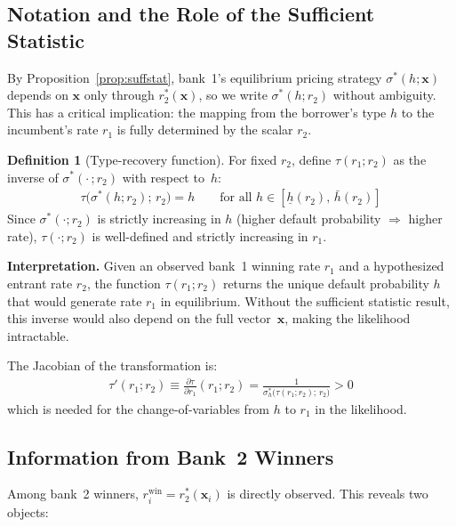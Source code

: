\documentclass[12pt]{article}
\theoremstyle{plain}
\theoremstyle{plain}
\theoremstyle{definition}  %
\newtheorem{definition}[thm]{Definition}  %
\theoremstyle{remark}  %
\begin{document}
\subsection{Notation and the Role of the Sufficient Statistic}\label{sec:prelim}

By Proposition~\ref{prop:suffstat}, bank~1's equilibrium pricing strategy $\sigma^*(h;\mathbf{x})$ depends on $\mathbf{x}$ only through $r_2^*(\mathbf{x})$, so we write $\sigma^*(h; r_2)$ without ambiguity. This has a critical implication: the mapping from the borrower's type $h$ to the incumbent's rate $r_1$ is fully determined by the scalar $r_2$.

\begin{definition}[Type-recovery function]\label{def:tau}
For fixed $r_2$, define $\tau(r_1; r_2)$ as the inverse of $\sigma^*(\cdot\,; r_2)$ with respect to~$h$:
\begin{align}\label{eq:tau_def}
    \tau\!\big(\sigma^*(h; r_2);\, r_2\big) = h \qquad \text{for all } h \in [\underline{h}(r_2),\, \bar{h}(r_2)]
\end{align}
Since $\sigma^*(\cdot; r_2)$ is strictly increasing in $h$ (higher default probability $\Rightarrow$ higher rate), $\tau(\cdot; r_2)$ is well-defined and strictly increasing in $r_1$.
\end{definition}

\medskip\noindent
\textbf{Interpretation.} Given an observed bank~1 winning rate $r_1$ and a hypothesized entrant rate $r_2$, the function $\tau(r_1; r_2)$ returns the unique default probability $h$ that would generate rate $r_1$ in equilibrium. Without the sufficient statistic result, this inverse would also depend on the full vector~$\mathbf{x}$, making the likelihood intractable.

\medskip\noindent
The Jacobian of the transformation is:
\begin{align}\label{eq:tau_prime}
    \tau'(r_1; r_2) \equiv \frac{\partial \tau}{\partial r_1}(r_1; r_2) = \frac{1}{\sigma^*_h\!\big(\tau(r_1;r_2);\, r_2\big)} > 0
\end{align}
which is needed for the change-of-variables from $h$ to $r_1$ in the likelihood.

\subsection{Information from Bank~2 Winners}\label{sec:bank2}

Among bank~2 winners, $r_i^{\text{win}} = r_2^*(\mathbf{x}_i)$ is directly observed. This reveals two objects:
\end{document}
